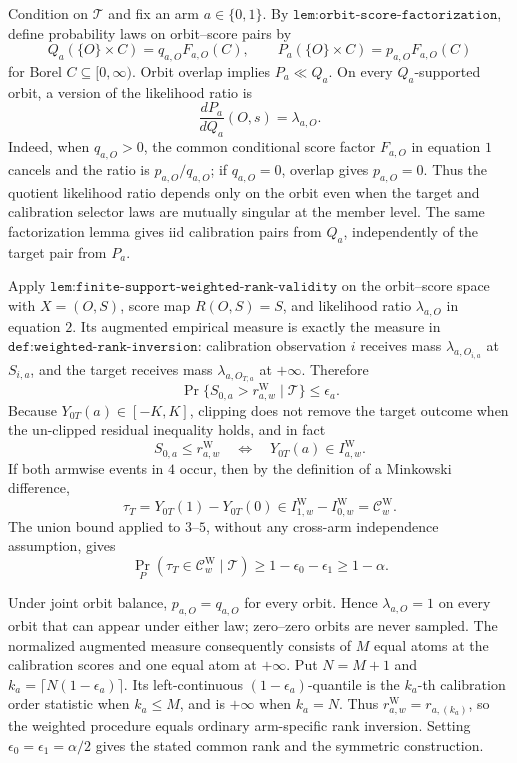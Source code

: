 Condition on \(\mathcal T\) and fix an arm \(a\in\{0,1\}\). By \(\texttt{lem:orbit-score-factorization}\), define probability laws on orbit--score pairs by
\[
Q_a(\{O\}\times C)=q_{a,O}F_{a,O}(C),\qquad
P_a(\{O\}\times C)=p_{a,O}F_{a,O}(C)\tag{1}
\]
for Borel \(C\subseteq[0,\infty)\). Orbit overlap implies \(P_a\ll Q_a\). On every \(Q_a\)-supported orbit, a version of the likelihood ratio is
\[
\frac{dP_a}{dQ_a}(O,s)=\lambda_{a,O}.\tag{2}
\]
Indeed, when \(q_{a,O}>0\), the common conditional score factor \(F_{a,O}\) in equation \(1\) cancels and the ratio is \(p_{a,O}/q_{a,O}\); if \(q_{a,O}=0\), overlap gives \(p_{a,O}=0\). Thus the quotient likelihood ratio depends only on the orbit even when the target and calibration selector laws are mutually singular at the member level. The same factorization lemma gives iid calibration pairs from \(Q_a\), independently of the target pair from \(P_a\).

Apply \(\texttt{lem:finite-support-weighted-rank-validity}\) on the orbit--score space with \(X=(O,S)\), score map \(R(O,S)=S\), and likelihood ratio \(\lambda_{a,O}\) in equation \(2\). Its augmented empirical measure is exactly the measure in \(\texttt{def:weighted-rank-inversion}\): calibration observation \(i\) receives mass \(\lambda_{a,O_{i,a}}\) at \(S_{i,a}\), and the target receives mass \(\lambda_{a,O_{T,a}}\) at \(+\infty\). Therefore
\[
\Pr\{S_{0,a}>r^{\mathrm W}_{a,w}\mid\mathcal T\}\le\epsilon_a.\tag{3}
\]
Because \(Y_{0T}(a)\in[-K,K]\), clipping does not remove the target outcome when the un-clipped residual inequality holds, and in fact
\[
S_{0,a}\le r^{\mathrm W}_{a,w}\quad\Longleftrightarrow\quad Y_{0T}(a)\in I^{\mathrm W}_{a,w}.\tag{4}
\]
If both armwise events in \(4\) occur, then by the definition of a Minkowski difference,
\[
\tau_T=Y_{0T}(1)-Y_{0T}(0)\in I^{\mathrm W}_{1,w}-I^{\mathrm W}_{0,w}=\mathcal C^{\mathrm W}_w.\tag{5}
\]
The union bound applied to \(3\)--\(5\), without any cross-arm independence assumption, gives
\[
\Pr_P(\tau_T\in\mathcal C^{\mathrm W}_w\mid\mathcal T)\ge1-\epsilon_0-\epsilon_1\ge1-\alpha.\tag{6}
\]

Under joint orbit balance, \(p_{a,O}=q_{a,O}\) for every orbit. Hence \(\lambda_{a,O}=1\) on every orbit that can appear under either law; zero--zero orbits are never sampled. The normalized augmented measure consequently consists of \(M\) equal atoms at the calibration scores and one equal atom at \(+\infty\). Put \(N=M+1\) and \(k_a=\lceil N(1-\epsilon_a)\rceil\). Its left-continuous \((1-\epsilon_a)\)-quantile is the \(k_a\)-th calibration order statistic when \(k_a\le M\), and is \(+\infty\) when \(k_a=N\). Thus \(r^{\mathrm W}_{a,w}=r_{a,(k_a)}\), so the weighted procedure equals ordinary arm-specific rank inversion. Setting \(\epsilon_0=\epsilon_1=\alpha/2\) gives the stated common rank and the symmetric construction.

